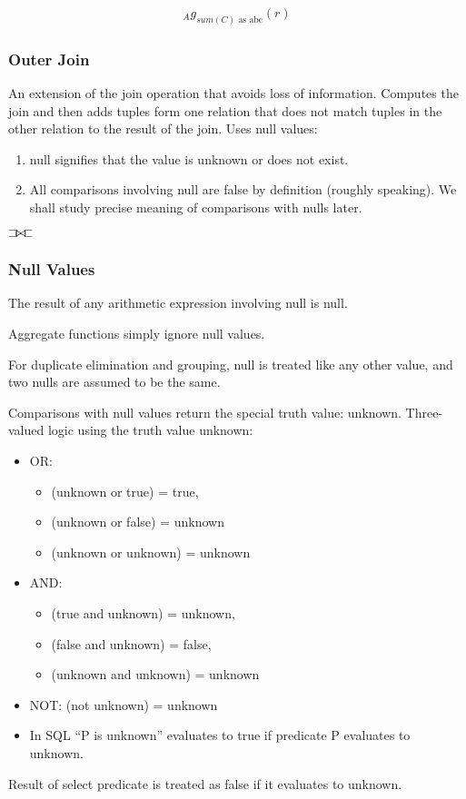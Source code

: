 \begin{align*}
    {}_A g_{sum(C) \text{ as abc}}(r)
\end{align*}

\subsubsection{Outer Join}

An extension of the join operation that avoids loss of information. Computes the join and then adds tuples form one relation that does not match tuples in the other relation to the result of the join. Uses null values:
\begin{enumerate}
    \item null signifies that the value is unknown or does not exist. 
    \item All comparisons involving null are false by definition (roughly speaking). We shall study precise meaning of comparisons with nulls later. 
\end{enumerate}

$\sqsupset\hspace*{-2pt}\bowtie\hspace*{-2pt}\sqsubset$

\subsubsection{Null Values}
The result of any arithmetic expression involving null is null. 

Aggregate functions simply ignore null values.  

For duplicate elimination and grouping, null is treated like any other value, and two nulls are assumed to be the same. 

Comparisons with null values return the special truth value:
unknown.  Three-valued logic using the truth value unknown:
\begin{itemize}
    \item OR: 
    \begin{itemize}
        \item (unknown or true) = true,
        \item (unknown or false) = unknown
        \item (unknown or unknown) = unknown 
    \end{itemize}
    \item AND: 
    \begin{itemize}
        \item (true and unknown) = unknown,
        \item (false and unknown) = false,
        \item (unknown and unknown) = unknown
    \end{itemize}
    \item NOT: (not unknown) = unknown
    \item In SQL “P is unknown” evaluates to true if predicate P evaluates to unknown. 
\end{itemize}
Result of select predicate is treated as false if it evaluates to unknown. 

